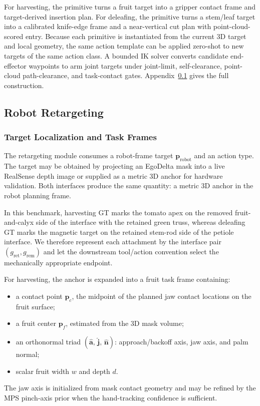 For harvesting, the primitive turns a fruit target into a gripper
contact frame and target-derived insertion plan.  For deleafing, the
primitive turns a stem/leaf target into a calibrated knife-edge frame
and a near-vertical cut plan with point-cloud-scored entry.  Because
each primitive is instantiated from the current 3D target and local
geometry, the same action template can be applied zero-shot to new
targets of the same action class.  A bounded IK solver converts
candidate end-effector waypoints to arm joint targets under
joint-limit, self-clearance, point-cloud path-clearance, and
task-contact gates.
Appendix~\ref{app:robot_retargeting} gives the full construction.



\subsection{Robot Retargeting}
\label{app:robot_retargeting}

\subsubsection{Target Localization and Task Frames}
\label{app:task_frame}

The retargeting module consumes a robot-frame target
$\mathbf{p}_{\mathrm{robot}}$ and an action type.  The target may be
obtained by projecting an EgoDelta mask into a live RealSense depth
image or supplied as a metric 3D anchor for hardware validation.
Both interfaces produce the same
quantity: a metric 3D anchor in the robot planning frame.

In this benchmark, harvesting GT marks the tomato apex on the removed
fruit-and-calyx side of the interface with the retained green truss,
whereas deleafing GT marks the magnetic target on the retained stem-rod
side of the petiole interface.
We therefore represent each attachment by the interface pair
$(g_{\mathrm{ret}},g_{\mathrm{rem}})$ and let the downstream tool/action
convention select the mechanically appropriate endpoint.

For harvesting, the anchor is expanded into a fruit task frame
containing:
%
\begin{itemize}
  \item a contact point $\mathbf{p}_c$, the midpoint of the planned jaw
    contact locations on the fruit surface;
  \item a fruit center $\mathbf{p}_f$, estimated from the 3D mask
    volume;
  \item an orthonormal triad
    $(\hat{\mathbf{a}},\,\hat{\mathbf{j}},\,\hat{\mathbf{n}})$:
    approach/backoff axis, jaw axis, and palm normal;
  \item scalar fruit width $w$ and depth $d$.
\end{itemize}
%
The jaw axis is initialized from mask contact geometry and may be
refined by the MPS pinch-axis prior when the hand-tracking confidence
is sufficient.

